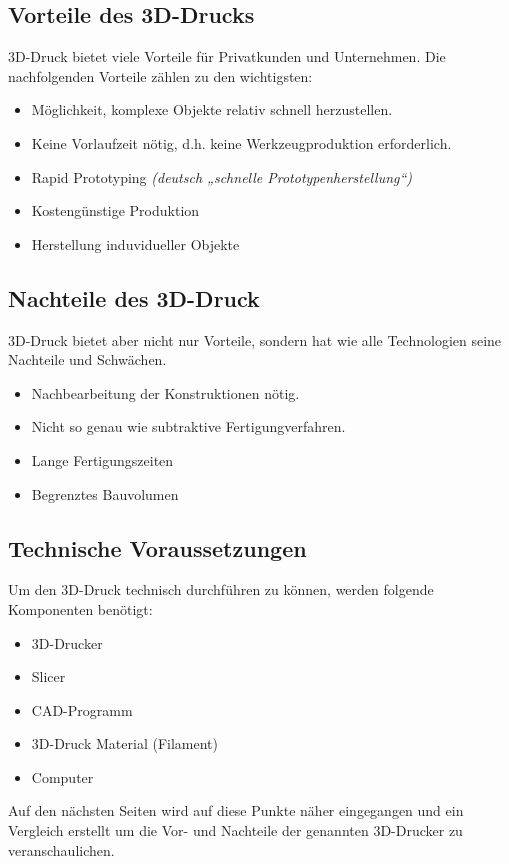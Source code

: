 \subsection{Vorteile des 3D-Drucks}
3D-Druck bietet viele Vorteile für Privatkunden und Unternehmen. Die nachfolgenden Vorteile zählen zu den wichtigsten:
\begin{itemize}
	\item Möglichkeit, komplexe Objekte relativ schnell herzustellen.
	\item Keine Vorlaufzeit nötig, d.h. keine Werkzeugproduktion erforderlich.
	\item Rapid Prototyping \emph{(deutsch „schnelle Prototypenherstellung“)}
	\item Kostengünstige Produktion
	\item Herstellung induvidueller Objekte
\end{itemize} \cite{3D-Druck-Vorteile}

\subsection{Nachteile des 3D-Druck}
3D-Druck bietet aber nicht nur Vorteile, sondern hat wie alle Technologien seine Nachteile und Schwächen.
\begin{itemize}
	\item Nachbearbeitung der Konstruktionen nötig.
	\item Nicht so genau wie subtraktive Fertigungverfahren.
	\item Lange Fertigungszeiten
	\item Begrenztes Bauvolumen
\end{itemize}
\cite{3D-Druck-Nachteile}

\subsection{Technische Voraussetzungen}
Um den 3D-Druck technisch durchführen zu können, werden folgende Komponenten benötigt:
\begin{itemize} 
	\item 3D-Drucker
	\item Slicer
	\item CAD-Programm
	\item 3D-Druck Material (Filament)
	\item Computer
\end{itemize}
Auf den nächsten Seiten wird auf diese Punkte näher eingegangen und ein Vergleich erstellt um die Vor- und Nachteile der genannten 3D-Drucker zu veranschaulichen. \cite{3ds}


